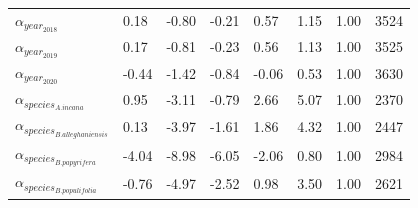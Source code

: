 \documentclass{article}\usepackage[]{graphicx}\usepackage[]{xcolor}
\begin{document}
\begin{table}[ht]
\begin{tabular}{llllllll}
  $\alpha_{year_{2018}}$ & 0.18 & -0.80 & -0.21 & 0.57 & 1.15 & 1.00 & 3524 \\ 
  $\alpha_{year_{2019}}$ & 0.17 & -0.81 & -0.23 & 0.56 & 1.13 & 1.00 & 3525 \\ 
  $\alpha_{year_{2020}}$ & -0.44 & -1.42 & -0.84 & -0.06 & 0.53 & 1.00 & 3630 \\ 
  $\alpha_{species_{A. incana}}$ & 0.95 & -3.11 & -0.79 & 2.66 & 5.07 & 1.00 & 2370 \\ 
  $\alpha_{species_{B. alleghaniensis}}$ & 0.13 & -3.97 & -1.61 & 1.86 & 4.32 & 1.00 & 2447 \\ 
  $\alpha_{species_{B. papyrifera}}$ & -4.04 & -8.98 & -6.05 & -2.06 & 0.80 & 1.00 & 2984 \\ 
  $\alpha_{species_{B. populifolia}}$ & -0.76 & -4.97 & -2.52 & 0.98 & 3.50 & 1.00 & 2621 \\ 
   \hline
\end{tabular}
\end{table}
\end{document}

